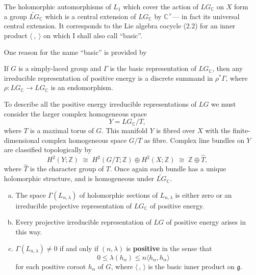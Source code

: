 \documentclass[12pt]{article}
\begin{document}
The holomorphic automorphisms of \(L_1\) which cover the action of \(LG_{\mathbb{C}}\) on \(X\)
form a group \(\widetilde{LG}_{\mathbb{C}}\) which is a central extension of \(LG_{\mathbb{C}}\) by \(\mathbb{C}^\times\)—
in fact its universal central extension.
It corresponds to the Lie algebra cocycle (2.2) for an inner product \(\langle\ ,\ \rangle\)
on which I shall also call ``basic''.

One reason for the name ``basic'' is provided by

\begin{proposition}
If \(G\) is a simply-laced group and \(\Gamma\) is the basic representation of \(LG_{\mathbb{C}}\),
then any irreducible representation of positive energy is a discrete summand in
\(\rho^*\Gamma\), where
\(\rho : LG_{\mathbb{C}} \to LG_{\mathbb{C}}\) is an endomorphism.
\end{proposition}

To describe all the positive energy irreducible representations of $LG$ we must consider the larger complex homogeneous space
\[
Y = LG_{\mathbb{C}} / T,
\]
where $T$ is a maximal torus of $G$.
This manifold $Y$ is fibred over $X$ with the finite-dimensional complex homogeneous space $G/T$ as fibre.
Complex line bundles on $Y$ are classified topologically by
\[
H^2(Y;\mathbb{Z}) \;\cong\;
H^2(G/T;\mathbb{Z}) \oplus H^2(X;\mathbb{Z})
\;\cong\; \mathbb{Z} \oplus \widehat{T},
\]
where $\widehat{T}$ is the character group of $T$.
Once again each bundle has a unique holomorphic structure,
and is homogeneous under $\widetilde{LG}_{\mathbb{C}}$. 

\begin{proposition}
\leavevmode
\begin{enumerate}[(a)]
\item
The space $\Gamma(L_{n,\lambda})$ of holomorphic sections of $L_{n,\lambda}$
is either zero or an irreducible projective representation of $LG_{\mathbb{C}}$
of positive energy.

\item
Every projective irreducible representation of $LG$ of positive energy
arises in this way.

\item
$\Gamma(L_{n,\lambda}) \neq 0$ if and only if $(n,\lambda)$ is
\textbf{positive} in the sense that
\[
0 \le \lambda(h_{\alpha}) \le n\langle h_{\alpha},h_{\alpha}\rangle
\]
for each positive coroot $h_{\alpha}$ of $G$,
where $\langle\, ,\,\rangle$ is the basic inner product on $\mathfrak{g}$.
\end{enumerate}
\end{proposition}
\end{document}
